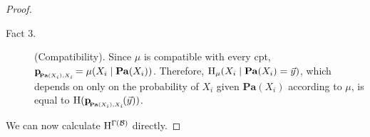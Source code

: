 \documentclass{article}
\newcommand{\bp}[1][L]{\mat{p}_{\!_{#1}\!}}
\newcommand\Pa{\mathbf{Pa}}
\numberwithin{equation}{section}
\begin{document}
\begin{proof}
\begin{description}
			\item[Fact 3.] (Compatibility). Since $\mu$ is compatible with every cpt, $\bp[\Pa(X_i),X_i] = \mu(X_i \mid \Pa(X_i))$. Therefore, $\H_\mu(X_i \mid \Pa(X_i) = \vec y) $, which depends on only on the probability of $X_i$ given $\Pa(X_i)$ according to $\mu$, is equal to $\H(\bp[\Pa(X_i),X_i](\vec y))$. 
		\end{description}
		We can now calculate $\mathrm{H}^{\Gamma(\cal B)}$ directly.
		
		

\end{proof}
\end{document}
